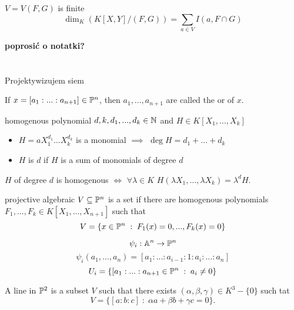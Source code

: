 \documentclass[twoside, a4paper, 12pt]{book}
\begin{document}
\begin{theorem}{}{}
  $V=V(F,G)$ is finite
  $$\dim_K(K[X,Y]/(F,G))=\sum_{a\in V}I(a, F\cap G)$$
\end{theorem}

\textbf{poprosić o notatki?}

\section{}{Projektywizujem siem}

If $x=[a_1:...:a_{n+1}]\in\mathbb{P}^n$, then $a_1,..., a_{n+1}$ are called the  or  of $x$.

\begin{definition}{homogenous polynomial}{}
  $d, k, d_1,..., d_k\in\mathbb{N}$ and $H\in K[X_1,..., X_k]$
  
  \begin{itemize}
    \item $H=aX_1^{d_1}...X_k^{d_k}$ is a monomial $\implies$ $\deg H=d_1+...+d_k$
    \item $H$ is  $d$ if $H$ is a sum of monomials of degree $d$
  \end{itemize}
\end{definition}

$H$ of degree $d$ is homogenous $\iff$ $\forall \lambda\in K$ $H(\lambda X_1,..., \lambda X_k)=\lambda^dH$.

\begin{definition}{projective algebraic}{}
  $V\subseteq \mathbb{P} ^n$ is a  set if there are homogenous polynomials $F_1,..., F_k\in K[X_1,..., X_{n+1}]$ such that 
  $$V=\{x\in\mathbb{P}^n\;:\;F_1(x)=0,..., F_k(x)=0\}$$
\end{definition}

$$\psi_i:\mathbb{A}^n\to \mathbb{P}^n$$
$$\psi_i(a_1,..., a_n)=[a_1:...:a_{i-1}:1:a_i:...:a_n]$$
$$U_i=\{[a_1:...:a_{n+1}\in\mathbb{P}^n\;:\;a_i\neq0\}$$

A line in $\mathbb{P}^2$ is a subset $V$ such that there exists $(\alpha,\beta,\gamma)\in K^3-\{0\}$ such tat 
$$V=\{[a:b:c]\;:\;\alpha a+\beta b+\gamma c=0\}.$$
\end{document}
